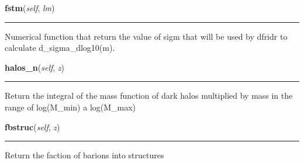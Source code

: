 \hspace{.8\funcindent}\begin{boxedminipage}{\funcwidth}

    \raggedright \textbf{fstm}(\textit{self}, \textit{lm})

    \vspace{-1.5ex}

    \rule{\textwidth}{0.5\fboxrule}
\setlength{\parskip}{2ex}
    Numerical function that return the value of sigm that will be used by 
    dfridr to calculate d\_sigma\_dlog10(m).

\setlength{\parskip}{1ex}
    \end{boxedminipage}

    \label{pycosmicstar:structuresabstract:structuresabstract:halos_n}

    \vspace{0.5ex}

\hspace{.8\funcindent}\begin{boxedminipage}{\funcwidth}

    \raggedright \textbf{halos\_n}(\textit{self}, \textit{z})

    \vspace{-1.5ex}

    \rule{\textwidth}{0.5\fboxrule}
\setlength{\parskip}{2ex}
    Return the integral of the mass function of dark halos multiplied by 
    mass in the range of log(M\_min) a log(M\_max)

\setlength{\parskip}{1ex}
    \end{boxedminipage}

    \label{pycosmicstar:structuresabstract:structuresabstract:fbstruc}

    \vspace{0.5ex}

\hspace{.8\funcindent}\begin{boxedminipage}{\funcwidth}

    \raggedright \textbf{fbstruc}(\textit{self}, \textit{z})

    \vspace{-1.5ex}

    \rule{\textwidth}{0.5\fboxrule}
\setlength{\parskip}{2ex}
    Return the faction of barions into structures

\setlength{\parskip}{1ex}
    \end{boxedminipage}

